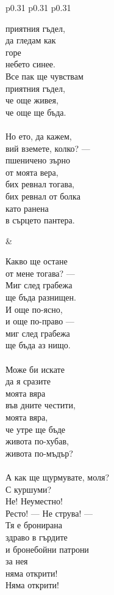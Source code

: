 \documentclass[12pt,a4paper]{article}
\begin{document}
\begin{tabular}{p{0.31\textwidth} p{0.31\textwidth} p{0.31\textwidth}}
\begin{minipage}[t]{\linewidth}
приятния гъдел,\\
да гледам как\\
горе\\
небето синее.\\
Все пак ще чувствам\\
приятния гъдел,\\
че още живея,\\
че още ще бъда.\\
\\
Но ето, да кажем,\\
вий вземете, колко? —\\
пшеничено зърно\\
от моята вера,\\
бих ревнал тогава,\\
бих ревнал от болка\\
като ранена\\
в сърцето пантера.\\
\end{minipage}
&
\begin{minipage}[t]{\linewidth}
Какво ще остане\\
от мене тогава? —\\
Миг след грабежа\\
ще бъда разнищен.\\
И още по-ясно,\\
и още по-право —\\
миг след грабежа\\
ще бъда аз нищо.\\
\\
Може би искате\\
да я сразите\\
моята вяра\\
във дните честити,\\
моята вяра,\\
че утре ще бъде\\
живота по-хубав,\\
живота по-мъдър?\\
\\
А как ще щурмувате, моля?\\
С куршуми?\\
Не! Неуместно!\\
Ресто! — Не струва! —\\
Тя е бронирана\\
здраво в гърдите\\
и бронебойни патрони\\
за нея\\
няма открити!\\
Няма открити!\\
\end{minipage}
\end{tabular}
\end{document}
